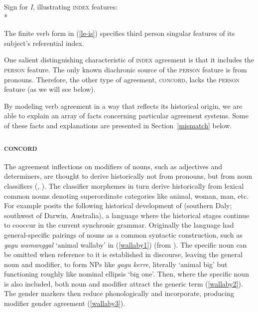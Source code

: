 \documentclass[output=paper
 	        ,biblatex
                ,babelshorthands
                ,newtxmath
                ,draftmode
                ,colorlinks, citecolor=brown
]{langscibook}
\begin{document}
\begin{exe} 
\ex	\label{entryfori2}
Sign for  \textit{I}, illustrating  \textsc{index} features:\\*
\end{exe}

\noindent
The finite verb form in (\ref{le-is}) specifies third person singular features of its subject's referential index.  

One salient distinguishing characteristic of \textsc{index} agreement is that it includes the \textsc{person} feature.  The only known diachronic source of the \textsc{person} feature is from pronouns.  Therefore, the other type of agreement, \textsc{concord}, lacks the \textsc{person} feature (as we will see below).  

By modeling verb agreement in a way that reflects its historical origin, we are able to explain an array of facts concerning particular agreement systems.   Some of these facts and explanations are presented in Section~\ref{mismatch} below.  
 



\subsubsection{\textsc{concord}}
\label{concord-sec}

The agreement inflections on modifiers of nouns, such as adjectives and determiners, are thought to derive historically not from pronouns, but from noun classifiers 
(\citealt{greenberg:1978,reid:1997,Seifart:2009,Grinevald+Seifart:2004}, \citealt[268--269]{corbett:2006}).
The classifier morphemes in turn derive historically from lexical common nouns denoting  superordinate categories like animal, woman, man, etc.  For example \citet{reid:1997} posits the following historical development of  (southern Daly; southwest of Darwin, Australia), a language where the historical stages continue to cooccur in the current synchronic grammar.   Originally the language had general-specific pairings of nouns as a common syntactic construction, such as  \textit{gagu wamanggal}  `animal wallaby’ in (\ref{wallaby1}) (from \citealt[216]{reid:1997}).  The specific noun can be omitted when reference to it is established in discourse, leaving the general noun and modifier, to form NPs like \textit{gagu kerre}, literally `animal big’ but functioning roughly like nominal ellipsis `big one’.  Then, where the specific noun is also included, both noun and modifier attract the generic term (\ref{wallaby2}).  The gender markers then reduce phonologically and incorporate, producing modifier gender agreement (\ref{wallaby3}). 
\end{document}
